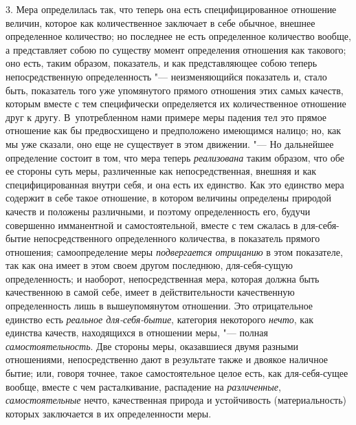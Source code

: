 3. Мера определилась так, что теперь она есть специфицированное отношение
величин, которое как количественное заключает в себе обычное, внешнее
определенное количество; но последнее не есть определенное количество
вообще, а представляет собою по существу момент определения отношения как
такового; оно есть, таким образом, показатель, и как представляющее собою
теперь непосредственную определенность "--- неизменяющийся показатель и, стало
быть, показатель того уже упомянутого прямого отношения этих самых качеств,
которым вместе с тем специфически определяется их количественное отношение
друг к другу. В~употребленном нами примере меры падения тел это прямое
отношение как бы предвосхищено и предположено имеющимся налицо; но, как мы
уже сказали, оно еще не существует в этом движении. "--- Но дальнейшее
определение состоит в том, что мера теперь
{\em реализована} таким образом, что обе ее стороны
суть меры, различенные как непосредственная, внешняя и как
специфицированная внутри себя, и она есть их единство. Как это единство
мера содержит в себе такое отношение, в котором величины определены природой
качеств и положены различными, и поэтому определенность его,
будучи совершенно имманентной и самостоятельной, вместе с тем сжалась в
для-себя-бытие непосредственного определенного количества, в показатель
прямого отношения; самоопределение меры
{\em подвергается отрицанию} в этом показателе, так как
она имеет в этом своем другом последнюю, для-себя-сущую определенность; и
наоборот, непосредственная мера, которая должна быть качественною в самой
себе, имеет в действительности качественную определенность лишь в
вышеупомянутом отношении. Это отрицательное единство есть
{\em реальное для-себя-бытие}, категория некоторого
{\em нечто}, как единства качеств, находящихся в
отношении меры, "--- полная {\em самостоятельность}. Две
стороны меры, оказавшиеся двумя разными отношениями, непосредственно дают в
результате также и двоякое наличное бытие; или, говоря точнее, такое
самостоятельное целое есть, как для-себя-сущее вообще, вместе с чем
расталкивание, распадение на {\em различенные},
{\em самостоятельные} нечто, качественная природа и
устойчивость (материальность) которых заключается в их определенности меры.
